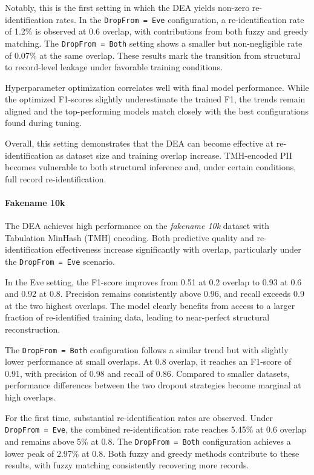 Notably, this is the first setting in which the DEA yields non-zero re-identification rates. In the \texttt{DropFrom = Eve} configuration, a re-identification rate of 1.2\% is observed at 0.6 overlap, with contributions from both fuzzy and greedy matching. The \texttt{DropFrom = Both} setting shows a smaller but non-negligible rate of 0.07\% at the same overlap. These results mark the transition from structural to record-level leakage under favorable training conditions.

Hyperparameter optimization correlates well with final model performance. While the optimized F1-scores slightly underestimate the trained F1, the trends remain aligned and the top-performing models match closely with the best configurations found during tuning.

Overall, this setting demonstrates that the DEA can become effective at re-identification as dataset size and training overlap increase. TMH-encoded PII becomes vulnerable to both structural inference and, under certain conditions, full record re-identification.


\paragraph{Fakename 10k}

The DEA achieves high performance on the \textit{fakename 10k} dataset with Tabulation MinHash (TMH) encoding. Both predictive quality and re-identification effectiveness increase significantly with overlap, particularly under the \texttt{DropFrom = Eve} scenario.

In the Eve setting, the F1-score improves from 0.51 at 0.2 overlap to 0.93 at 0.6 and 0.92 at 0.8. Precision remains consistently above 0.96, and recall exceeds 0.9 at the two highest overlaps. The model clearly benefits from access to a larger fraction of re-identified training data, leading to near-perfect structural reconstruction.

The \texttt{DropFrom = Both} configuration follows a similar trend but with slightly lower performance at small overlaps. At 0.8 overlap, it reaches an F1-score of 0.91, with precision of 0.98 and recall of 0.86. Compared to smaller datasets, performance differences between the two dropout strategies become marginal at high overlaps.

For the first time, substantial re-identification rates are observed. Under \texttt{DropFrom = Eve}, the combined re-identification rate reaches 5.45\% at 0.6 overlap and remains above 5\% at 0.8. The \texttt{DropFrom = Both} configuration achieves a lower peak of 2.97\% at 0.8. Both fuzzy and greedy methods contribute to these results, with fuzzy matching consistently recovering more records.

